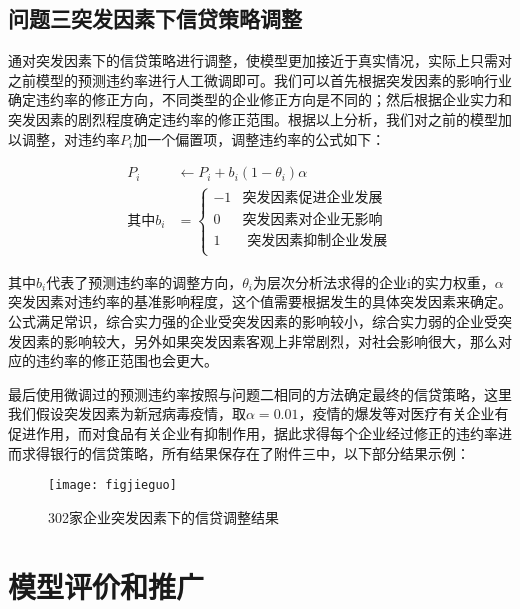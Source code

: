 \documentclass{cumcmthesis}
\begin{document}
\subsection{问题三突发因素下信贷策略调整}
通对突发因素下的信贷策略进行调整，使模型更加接近于真实情况，实际上只需对之前模型的预测违约率进行人工微调即可。我们可以首先根据突发因素的影响行业确定违约率的修正方向，不同类型的企业修正方向是不同的；然后根据企业实力和突发因素的剧烈程度确定违约率的修正范围。根据以上分析，我们对之前的模型加以调整，对违约率$P_i$加一个偏置项，调整违约率的公式如下：

\begin{equation}
    \begin{split}
         P_i &\gets  P_i + b_i \left(1-\theta_i \right) \alpha \\
        \mbox{其中} b_i & = 
        \begin{cases}
            -1 & \mbox{突发因素促进企业发展} \\
            0 & \mbox{突发因素对企业无影响} \\
            1 &\mbox{ 突发因素抑制企业发展} \\
        \end{cases}
    \end{split}
\end{equation}

其中$b_i$代表了预测违约率的调整方向，$\theta_i$为层次分析法求得的企业i的实力权重，$\alpha$ 突发因素对违约率的基准影响程度，这个值需要根据发生的具体突发因素来确定。公式满足常识，综合实力强的企业受突发因素的影响较小，综合实力弱的企业受突发因素的影响较大，另外如果突发因素客观上非常剧烈，对社会影响很大，那么对应的违约率的修正范围也会更大。

最后使用微调过的预测违约率按照与问题二相同的方法确定最终的信贷策略，这里我们假设突发因素为新冠病毒疫情，取$\alpha = 0.01$，疫情的爆发等对医疗有关企业有促进作用，而对食品有关企业有抑制作用，据此求得每个企业经过修正的违约率进而求得银行的信贷策略，所有结果保存在了附件三中，以下部分结果示例：

\begin{figure}[H]
    \centering
    \texttt{[image: figjieguo]}
    \caption{302家企业突发因素下的信贷调整结果}
    \label{figjieguo}
\end{figure}

\section{模型评价和推广}
\end{document}
